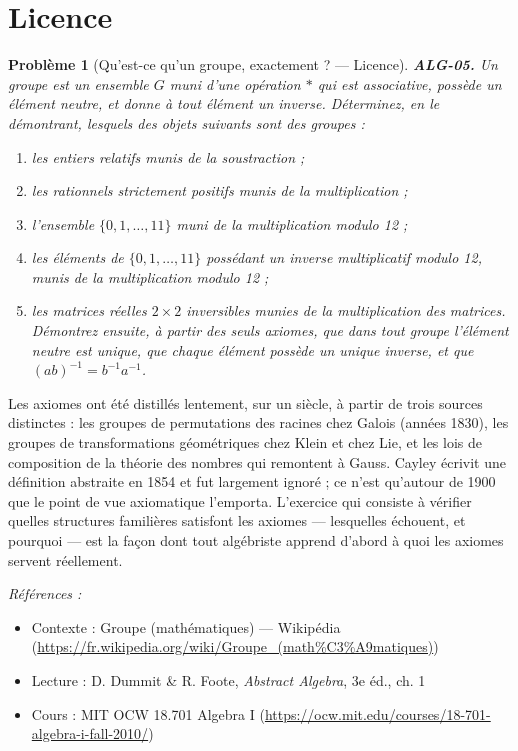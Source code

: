 \documentclass[11pt]{article}
\newtheorem{problem}{Problème}
\newenvironment{refs}{\par\small\noindent\emph{Références :}\begin{itemize}\setlength\itemsep{0pt}}{\end{itemize}\normalsize}
\begin{document}
\section*{Licence}

\begin{problem}[{Qu'est-ce qu'un groupe, exactement ? --- Licence}]
\textbf{ALG-05.} Un \textit{groupe} est un ensemble $G$ muni d'une opération $*$ qui
est associative, possède un élément neutre, et donne à tout élément un inverse. Déterminez, en le
démontrant, lesquels des objets suivants sont des groupes :
\begin{enumerate}
\item[(a)] les entiers relatifs munis de la soustraction ;
\item[(b)] les rationnels
strictement positifs munis de la multiplication ;
\item[(c)] l'ensemble $\{0, 1, \dots, 11\}$ muni de la multiplication modulo 12 ;
\item[(d)] les éléments de $\{0, 1, \dots, 11\}$ possédant un inverse multiplicatif modulo 12, munis de la
multiplication modulo 12 ;
\item[(e)] les matrices réelles $2 \times 2$ inversibles munies de la multiplication des matrices.
Démontrez ensuite, à partir des seuls axiomes, que dans tout groupe l'élément neutre est unique, que
chaque élément possède un unique inverse, et que $(ab)^{-1} = b^{-1}a^{-1}$.
\end{enumerate}

\end{problem}

\noindent Les axiomes ont été distillés lentement, sur un siècle, à partir de trois sources distinctes :
les groupes de permutations des racines chez Galois (années 1830), les groupes de transformations
géométriques chez Klein et chez Lie, et les lois de composition de la théorie des nombres qui remontent à
Gauss. Cayley écrivit une définition abstraite en 1854 et fut largement ignoré ; ce n'est qu'autour de 1900
que le point de vue axiomatique l'emporta. L'exercice qui consiste à vérifier quelles structures familières
satisfont les axiomes --- lesquelles échouent, et pourquoi --- est la façon dont tout algébriste apprend d'abord
à quoi les axiomes servent réellement.

\begin{refs}
\item Contexte : Groupe (mathématiques) --- Wikipédia (\url{https://fr.wikipedia.org/wiki/Groupe_(math%C3%A9matiques)})
\item Lecture : D. Dummit \& R. Foote, \textit{Abstract Algebra}, 3e éd., ch. 1
\item Cours : MIT OCW 18.701 Algebra I (\url{https://ocw.mit.edu/courses/18-701-algebra-i-fall-2010/})
\end{refs}
\end{document}
